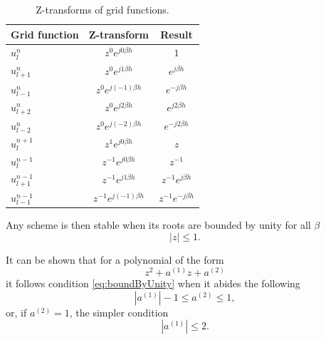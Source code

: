 {\renewcommand{\arraystretch}{1.2}

\begin{table}[h]
    \begin{center}
    \begin{tabular}{|l|c|c|}
        \hline
        Grid function & Z-transform & Result\\ \hline
        $u_l^n$ & $z^0 e^{j0\beta h}$ & $1$\\
        $u_{l+1}^n$ & $z^0 e^{j1\beta h}$ & $e^{j\beta h}$\\
        $u_{l-1}^n$ & $z^0 e^{j(-1)\beta h}$ & $e^{-j\beta h}$\\
        $u_{l+2}^n$ & $z^0 e^{j2\beta h}$ & $e^{j2\beta h}$\\
        $u_{l-2}^n$ & $z^0 e^{j(-2)\beta h}$ & $e^{-j2\beta h}$\\
        $u_l^{n+1}$ & $z^1 e^{j0\beta h}$ & $z$\\
        $u_l^{n-1}$ & $z^{-1} e^{j0\beta h}$ & $z^{-1}$\\
        $u_{l+1}^{n-1}$ & $z^{-1} e^{j1\beta h}$ & $z^{-1}e^{j\beta h}$\\
        $u_{l-1}^{n-1}$ & $z^{-1} e^{j(-1)\beta h}$ & $z^{-1}e^{-j\beta h}$\\\hline
    \end{tabular}
    \caption{Z-transforms of grid functions.\label{tab:zIdentities}}
    \end{center}
\end{table}
{\renewcommand{\arraystretch}{1}

Any scheme is then stable when its roots are bounded by unity for all $\beta$
\begin{equation}\label{eq:boundByUnity}
    |z| \leq 1.
\end{equation} 

It can be shown that for a polynomial of the form 
\begin{equation}\label{eq:polynomialForm}
    z^2 + a^{(1)}z + a^{(2)}
\end{equation} 
it follows condition \eqref{eq:boundByUnity} when it abides the following \cite{theBible}
\begin{equation}\label{eq:condition214}
    |a^{(1)}| - 1 \leq a^{(2)} \leq 1,
\end{equation}
or, if $a^{(2)} = 1$, the simpler condition
\begin{equation}\label{eq:simplerCondition215}
    |a^{(1)}|\leq 2.
\end{equation}

}}
